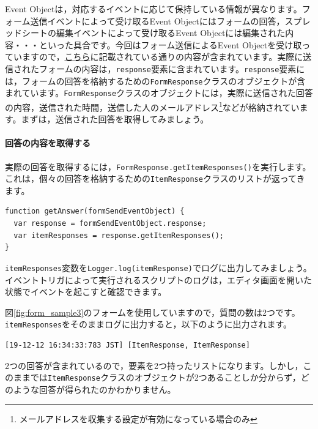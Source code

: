 \documentclass[uplatex,a4j]{jsarticle}
\begin{document}
Event Objectは，対応するイベントに応じて保持している情報が異なります。フォーム送信イベントによって受け取るEvent Objectにはフォームの回答，スプレッドシートの編集イベントによって受け取るEvent Objectには編集された内容・・・といった具合です。今回はフォーム送信によるEvent Objectを受け取っていますので，\href{https://developers.google.com/apps-script/guides/triggers/events?hl=en#form-submit_1}{こちら}に記載されている通りの内容が含まれています。実際に送信されたフォームの内容は，\verb|response|要素に含まれています。\verb|response|要素には，フォームの回答を格納するための\verb|FormResponse|クラスのオブジェクトが含まれています。\verb|FormResponse|クラスのオブジェクトには，実際に送信された回答の内容，送信された時間，送信した人のメールアドレス\footnote{メールアドレスを収集する設定が有効になっている場合のみ}などが格納されています。まずは，送信された回答を取得してみましょう。

\paragraph{回答の内容を取得する}

実際の回答を取得するには，\verb|FormResponse.getItemResponses()|を実行します。これは，個々の回答を格納するための\verb|ItemResponse|クラスのリストが返ってきます。

\begin{lstlisting}[basicstyle=\ttfamily\footnotesize,frame=single,caption=Event Object sample 2]
function getAnswer(formSendEventObject) {
  var response = formSendEventObject.response;
  var itemResponses = response.getItemResponses();
}
\end{lstlisting}

\verb|itemResponses|変数を\verb|Logger.log(itemResponse)|でログに出力してみましょう。イベントトリガによって実行されるスクリプトのログは，エディタ画面を開いた状態でイベントを起こすと確認できます。


図\ref{fig:form_sample3}のフォームを使用していますので，質問の数は2つです。\verb|itemResponses|をそのままログに出力すると，以下のように出力されます。

\begin{lstlisting}[basicstyle=\ttfamily\footnotesize,frame=single,caption=Event Object output example 1]
[19-12-12 16:34:33:783 JST] [ItemResponse, ItemResponse]
\end{lstlisting}

2つの回答が含まれているので，要素を2つ持ったリストになります。しかし，このままでは\verb|ItemResponse|クラスのオブジェクトが2つあることしか分からず，どのような回答が得られたのかわかりません。
\end{document}
